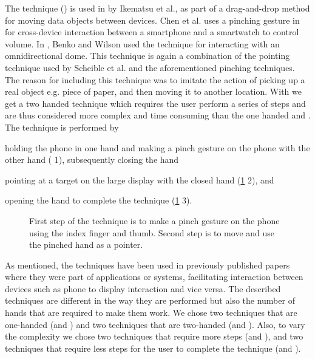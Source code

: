 The \pinch technique () is used in \cite{Ikematsu:2015} by Ikematsu et al., as part of a drag-and-drop method for moving data objects between devices.
Chen et al. uses a pinching gesture in \cite{Chen:2014} for cross-device interaction between a smartphone and a smartwatch to control volume. 
In \cite{Benko:2010}, Benko and Wilson used the \pinch technique for interacting with an omnidirectional dome.
This technique is again a combination of the pointing technique used by Scheible et al. and the aforementioned pinching techniques. 
The reason for including this technique was to imitate the action of picking up a real object e.g. piece of paper, and then moving it to another location.
With \pinch we get a two handed technique which requires the user perform a series of steps and are thus considered more complex and time consuming  than the one handed \swipe and \tilt.
The \pinch technique is performed by 
\begin{enumerate*}[label=\itshape\roman*\upshape)]
	\item{holding the phone in one hand and making a pinch gesture on the phone with the other hand ( 1), subsequently closing the hand}
	\item{pointing at a target on the large display with the closed hand (\cref{fig:pinchTechnique} 2), and}
	\item{opening the hand to complete the technique (\cref{fig:pinchTechnique} 3).}
\end{enumerate*}

\begin{figure}[H]
\caption{
	\protect{} First step of the \pinch technique is to make a pinch gesture on the phone using the index finger and thumb. Second step is to move and use the pinched hand as a pointer.
}
\label{fig:pinchTechnique}
\end{figure}

As mentioned, the techniques have been used in previously published papers where they were part of applications or systems, facilitating interaction between devices such as phone to display interaction and vice versa. 
The described techniques are different in the way they are performed but also the number of hands that are required to make them work.
We chose two techniques that are one-handed (\swipe and \tilt) and two techniques that are two-handed (\throw and \pinch).
Also, to vary the complexity we chose two techniques that require more steps (\throw and \pinch), and two techniques that require less steps for the user to complete the technique (\swipe and \tilt).